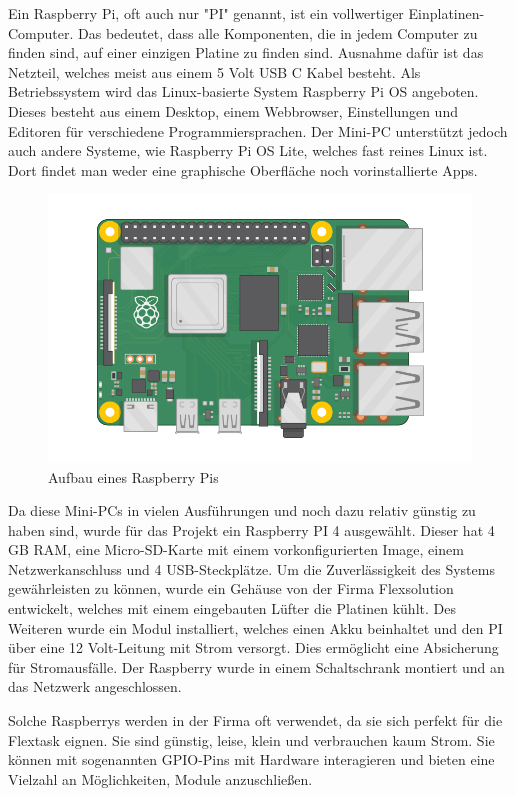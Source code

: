 Ein Raspberry Pi, oft auch nur "PI" genannt, ist ein vollwertiger Einplatinen-Computer. Das bedeutet, dass alle Komponenten, die in jedem Computer zu finden sind, auf einer einzigen Platine zu finden sind. Ausnahme dafür ist das Netzteil, welches meist aus einem 5 Volt USB C Kabel besteht. Als Betriebssystem wird das Linux-basierte System Raspberry Pi OS angeboten. Dieses besteht aus einem Desktop, einem Webbrowser, Einstellungen und Editoren für verschiedene Programmiersprachen. Der Mini-PC unterstützt jedoch auch andere Systeme, wie Raspberry Pi OS Lite, welches fast reines Linux ist. Dort findet man weder eine graphische Oberfläche noch vorinstallierte Apps.  

\begin{figure}[h t]
    \centering
    \includegraphics[scale=0.5]{pics/raspberry-pi.png}
    \caption{Aufbau eines Raspberry Pis}
    \label{fig:impl:RaspiAufbau}
  \end{figure}

  Da diese Mini-PCs in vielen Ausführungen und noch dazu relativ günstig zu haben sind, wurde für das Projekt ein Raspberry PI 4 ausgewählt. Dieser hat 4 GB RAM, eine Micro-SD-Karte mit einem vorkonfigurierten Image, einem Netzwerkanschluss und 4 USB-Steckplätze. Um die Zuverlässigkeit des Systems gewährleisten zu können, wurde ein Gehäuse von der Firma Flexsolution entwickelt, welches mit einem eingebauten Lüfter die Platinen kühlt. Des Weiteren wurde ein Modul installiert, welches einen Akku beinhaltet und den PI über eine 12 Volt-Leitung mit Strom versorgt. Dies ermöglicht eine Absicherung für Stromausfälle. Der Raspberry wurde in einem Schaltschrank montiert und an das Netzwerk angeschlossen.   

Solche Raspberrys werden in der Firma oft verwendet, da sie sich perfekt für die Flextask eignen. Sie sind günstig, leise, klein und verbrauchen kaum Strom. Sie können mit sogenannten GPIO-Pins mit Hardware interagieren und bieten eine Vielzahl an Möglichkeiten, Module anzuschließen.   